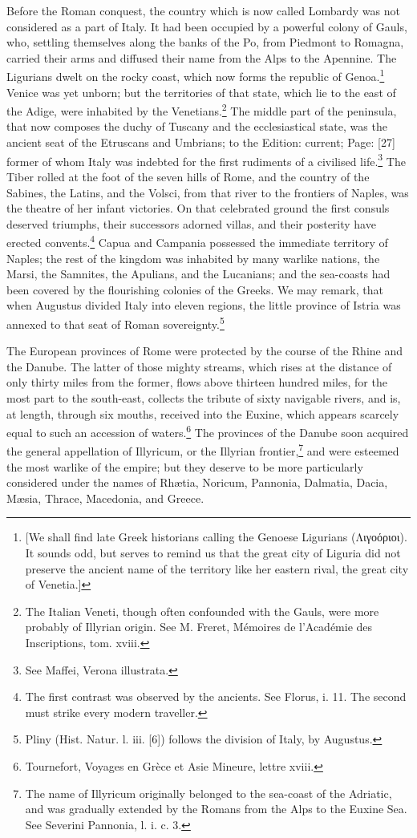 Before the Roman conquest, the country which is now called Lombardy was not considered as a part of Italy. It had been occupied by a powerful colony of Gauls, who, settling themselves along the banks of the Po, from Piedmont to Romagna, carried their arms and diffused their name from the Alps to the Apennine. The Ligurians dwelt on the rocky coast, which now forms the republic of Genoa.\footnote{[We shall find late Greek historians calling the Genoese Ligurians (\textgreek{Λιγοόριοι}). It sounds odd, but serves to remind us that the great city of Liguria did not preserve the ancient name of the territory like her eastern rival, the great city of Venetia.]} Venice was yet unborn; but the territories of that state, which lie to the east of the Adige, were inhabited by the Venetians.\footnote{The Italian Veneti, though often confounded with the Gauls, were more probably of Illyrian origin. See M. Freret, Mémoires de l\texthebrew{}’Académie des Inscriptions, tom. xviii.} The middle part of the peninsula, that now composes the duchy of Tuscany and the ecclesiastical state, was the ancient seat of the Etruscans and Umbrians; to the Edition: current; Page: [27] former of whom Italy was indebted for the first rudiments of a civilised life.\footnote{See Maffei, Verona illustrata.} The Tiber rolled at the foot of the seven hills of Rome, and the country of the Sabines, the Latins, and the Volsci, from that river to the frontiers of Naples, was the theatre of her infant victories. On that celebrated ground the first consuls deserved triumphs, their successors adorned villas, and their posterity have erected convents.\footnote{The first contrast was observed by the ancients. See Florus, i. 11. The second must strike every modern traveller.} Capua and Campania possessed the immediate territory of Naples; the rest of the kingdom was inhabited by many warlike nations, the Marsi, the Samnites, the Apulians, and the Lucanians; and the sea-coasts had been covered by the flourishing colonies of the Greeks. We may remark, that when Augustus divided Italy into eleven regions, the little province of Istria was annexed to that seat of Roman sovereignty.\footnote{Pliny (Hist. Natur. l. iii. [6]) follows the division of Italy, by Augustus.}

The European provinces of Rome were protected by the course of the Rhine and the Danube. The latter of those mighty streams, which rises at the distance of only thirty miles from the former, flows above thirteen hundred miles, for the most part to the south-east, collects the tribute of sixty navigable rivers, and is, at length, through six mouths, received into the Euxine, which appears scarcely equal to such an accession of waters.\footnote{Tournefort, Voyages en Grèce et Asie Mineure, lettre xviii.} The provinces of the Danube soon acquired the general appellation of Illyricum, or the Illyrian frontier,\footnote{The name of Illyricum originally belonged to the sea-coast of the Adriatic, and was gradually extended by the Romans from the Alps to the Euxine Sea. See Severini Pannonia, l. i. c. 3.} and were esteemed the most warlike of the empire; but they deserve to be more particularly considered under the names of Rhætia, Noricum, Pannonia, Dalmatia, Dacia, Mæsia, Thrace, Macedonia, and Greece.

